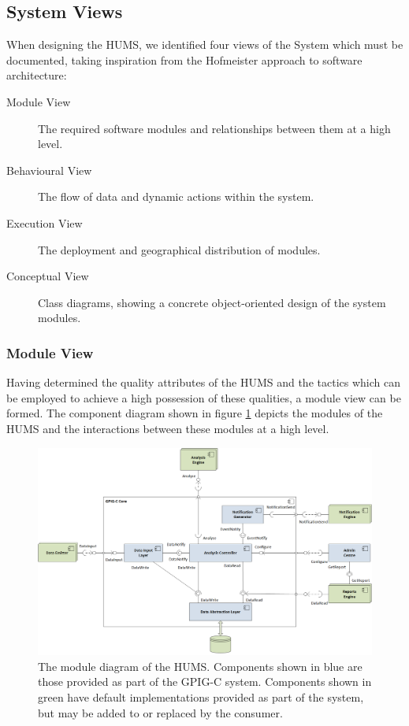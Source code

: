 \documentclass[10pt,a4paper]{article}
\begin{document}
\subsection{System Views}
\label{sec:architecture-views}

When designing the HUMS, we identified four views of the System which must be
documented, taking inspiration from the Hofmeister\cite{hof1999} approach to
software architecture:

\begin{description}
  \item[Module View] The required software modules and relationships
    between them at a high level.

  \item[Behavioural View] The flow of data and dynamic actions within
    the system.

  \item[Execution View] The deployment and geographical distribution of modules.

  \item[Conceptual View] Class diagrams, showing a concrete object-oriented
    design of the system modules.
\end{description}

\subsubsection{Module View}
\label{sec:architecture-moduleview}

Having determined the quality attributes of the HUMS and the tactics
which can be employed to achieve a high possession of these
qualities, a module view can be formed. The component diagram
shown in figure \ref{fig:ComponentDiagram} depicts the modules of the
HUMS and the interactions between these modules at a high level.

\begin{figure}[!ht]
  \centering
  \includegraphics[width=14cm]{images/ComponentDiagram.png}
  \caption{The module diagram of the HUMS. Components shown in blue are those provided as part of the GPIG-C system. Components shown in green have default implementations provided as part of the system, but may be added to or replaced by the consumer.}
  \label{fig:ComponentDiagram}
\end{figure}
\end{document}
